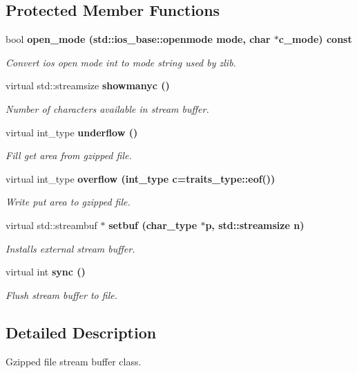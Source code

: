 \subsection*{Protected Member Functions}
\begin{CompactItemize}
\item 
bool \bf{open\_\-mode} (std::ios\_\-base::openmode mode, char $\ast$c\_\-mode) const 
\begin{CompactList}\small\item\em Convert ios open mode int to mode string used by zlib. \item\end{CompactList}\item 
virtual std::streamsize \bf{showmanyc} ()
\begin{CompactList}\small\item\em Number of characters available in stream buffer. \item\end{CompactList}\item 
virtual int\_\-type \bf{underflow} ()
\begin{CompactList}\small\item\em Fill get area from gzipped file. \item\end{CompactList}\item 
virtual int\_\-type \bf{overflow} (int\_\-type c=traits\_\-type::eof())
\begin{CompactList}\small\item\em Write put area to gzipped file. \item\end{CompactList}\item 
virtual std::streambuf $\ast$ \bf{setbuf} (char\_\-type $\ast$p, std::streamsize n)
\begin{CompactList}\small\item\em Installs external stream buffer. \item\end{CompactList}\item 
virtual int \bf{sync} ()
\begin{CompactList}\small\item\em Flush stream buffer to file. \item\end{CompactList}\end{CompactItemize}


\subsection{Detailed Description}
Gzipped file stream buffer class. 

